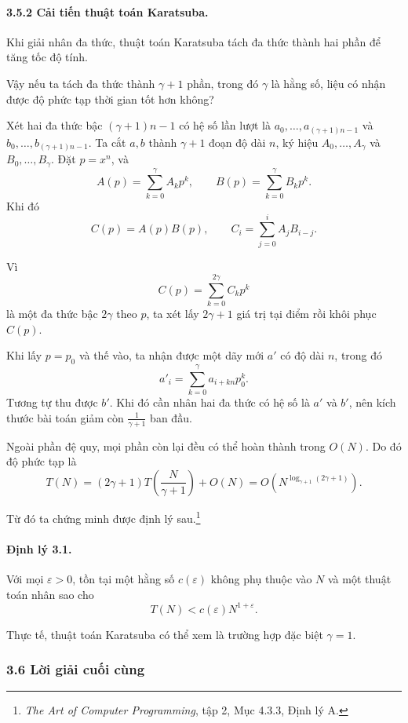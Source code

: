 \documentclass[11pt]{article}
\begin{document}
\paragraph{3.5.2 Cải tiến thuật toán Karatsuba.}
Khi giải nhân đa thức, thuật toán Karatsuba tách đa thức thành hai phần để tăng
tốc độ tính.

Vậy nếu ta tách đa thức thành \(\gamma+1\) phần, trong đó \(\gamma\) là hằng
số, liệu có nhận được độ phức tạp thời gian tốt hơn không?

Xét hai đa thức bậc \((\gamma+1)n-1\) có hệ số lần lượt là
\(a_0,\ldots,a_{(\gamma+1)n-1}\) và
\(b_0,\ldots,b_{(\gamma+1)n-1}\). Ta cắt \(a,b\) thành \(\gamma+1\) đoạn độ
dài \(n\), ký hiệu \(A_0,\ldots,A_\gamma\) và \(B_0,\ldots,B_\gamma\). Đặt
\(p=x^n\), và
\[
  A(p)=\sum_{k=0}^{\gamma}A_kp^k,\qquad
  B(p)=\sum_{k=0}^{\gamma}B_kp^k.
\]
Khi đó
\[
  C(p)=A(p)B(p),\qquad
  C_i=\sum_{j=0}^{i}A_jB_{i-j}.
\]

Vì
\[
  C(p)=\sum_{k=0}^{2\gamma}C_kp^k
\]
là một đa thức bậc \(2\gamma\) theo \(p\), ta xét lấy \(2\gamma+1\) giá trị tại
điểm rồi khôi phục \(C(p)\).

Khi lấy \(p=p_0\) và thế vào, ta nhận được một dãy mới \(a'\) có độ dài \(n\),
trong đó
\[
  a'_i=\sum_{k=0}^{\gamma}a_{i+kn}p_0^k.
\]
Tương tự thu được \(b'\). Khi đó cần nhân hai đa thức có hệ số là \(a'\) và
\(b'\), nên kích thước bài toán giảm còn \(\frac{1}{\gamma+1}\) ban đầu.

Ngoài phần đệ quy, mọi phần còn lại đều có thể hoàn thành trong \(O(N)\). Do đó
độ phức tạp là
\[
  T(N)=(2\gamma+1)T\left(\frac{N}{\gamma+1}\right)+O(N)
  =
  O\left(N^{\log_{\gamma+1}(2\gamma+1)}\right).
\]

Từ đó ta chứng minh được định lý sau.\footnote{\emph{The Art of Computer
Programming}, tập 2, Mục 4.3.3, Định lý A.}

\paragraph{Định lý 3.1.}
Với mọi \(\varepsilon>0\), tồn tại một hằng số \(c(\varepsilon)\) không phụ
thuộc vào \(N\) và một thuật toán nhân sao cho
\[
  T(N)<c(\varepsilon)N^{1+\varepsilon}.
\]

Thực tế, thuật toán Karatsuba có thể xem là trường hợp đặc biệt \(\gamma=1\).

\subsubsection*{3.6 Lời giải cuối cùng}
\end{document}
